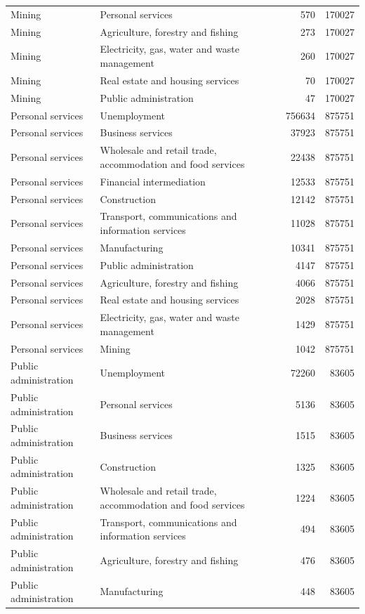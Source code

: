 \begin{longtable}{llrr}
Mining & Personal services & 570 & 170027 \\
Mining & Agriculture, forestry and fishing & 273 & 170027 \\
Mining & Electricity, gas, water and waste management & 260 & 170027 \\
Mining & Real estate and housing services & 70 & 170027 \\
Mining & Public administration & 47 & 170027 \\
Personal services & Unemployment & 756634 & 875751 \\
Personal services & Business services & 37923 & 875751 \\
Personal services & Wholesale and retail trade, accommodation and food services & 22438 & 875751 \\
Personal services & Financial intermediation & 12533 & 875751 \\
Personal services & Construction & 12142 & 875751 \\
Personal services & Transport, communications and information services & 11028 & 875751 \\
Personal services & Manufacturing & 10341 & 875751 \\
Personal services & Public administration & 4147 & 875751 \\
Personal services & Agriculture, forestry and fishing & 4066 & 875751 \\
Personal services & Real estate and housing services & 2028 & 875751 \\
Personal services & Electricity, gas, water and waste management & 1429 & 875751 \\
Personal services & Mining & 1042 & 875751 \\
Public administration & Unemployment & 72260 & 83605 \\
Public administration & Personal services & 5136 & 83605 \\
Public administration & Business services & 1515 & 83605 \\
Public administration & Construction & 1325 & 83605 \\
Public administration & Wholesale and retail trade, accommodation and food services & 1224 & 83605 \\
Public administration & Transport, communications and information services & 494 & 83605 \\
Public administration & Agriculture, forestry and fishing & 476 & 83605 \\
Public administration & Manufacturing & 448 & 83605 \\

\end{longtable}
